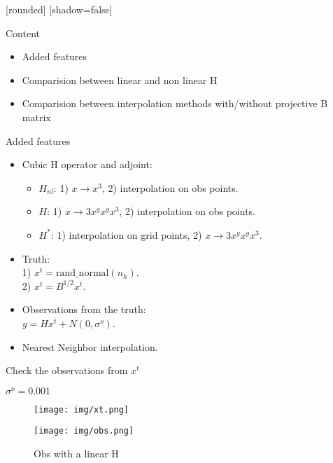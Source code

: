 \documentclass[francais]{beamer}
\title[Nicolas Baillot d'Etivaux]{}
\begin{document}
[rounded]%
[shadow=false]


\begin{frame}{Content}
\begin{itemize}
\item Added features
\item Comparision between linear and non linear H
\item Comparision between interpolation methods with/without projective B matrix
\end{itemize}
\end{frame}


\begin{frame}{Added features}
\begin{itemize}
 \item Cubic H operator and adjoint:
 \begin{itemize}
  \item $H_{nl}$: 1) $x \rightarrow x^3$, 2) interpolation on obs points.
  \item $H$: 1) $x \rightarrow 3 x^g  x^g  x^3$, 2) interpolation on obs points.
  \item $H^*$: 1) interpolation on grid points, 2) $x \rightarrow 3 x^g  x^g  x^3$. 
 \end{itemize}
 \vspace{+0.2cm}
 \item Truth:\\
  1) $x^t = \textrm{rand\_normal}(n_h)$.\\
  2) $x^t = B^{1/2} x^t$.
  \vspace{+0.2cm}
 \item Observations from the truth:\\
     $y = H x^t + N(0,\sigma^o)$.
 \vspace{+0.2cm}
 \item Nearest Neighbor interpolation.    
\end{itemize}
\end{frame}


\begin{frame}{Check the observations from $x^t$}
\begin{center}
$ \sigma^o = 0.001$\\ 
\begin{figure}
  \texttt{[image: img/xt.png]}
  \caption{$x^t$}
\endminipage\hfill
{}
  \texttt{[image: img/obs.png]}
  \caption{Obs with a linear H}
\endminipage
\end{figure}
\end{center}
\end{frame}
\end{document}
